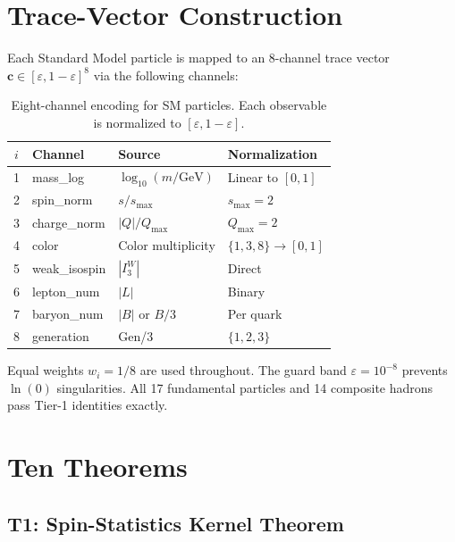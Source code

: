 \documentclass[
  aps,
  prd,
  twocolumn,
  superscriptaddress,
  nofootinbib,
  floatfix
]{revtex4-2}
\newcommand{\eps}{\varepsilon}
\newcommand{\tvec}{\mathbf{c}}
\begin{document}
\section{Trace-Vector Construction}\label{sec:trace}

Each Standard Model particle is mapped to an 8-channel trace
vector $\tvec \in [\eps, 1{-}\eps]^8$ via the following channels:

\begin{table}[h]
\caption{\label{tab:channels}Eight-channel encoding for SM particles.
Each observable is normalized to $[\eps, 1{-}\eps]$.}
\begin{ruledtabular}
\begin{tabular}{clll}
$i$ & Channel & Source & Normalization \\
\hline
1 & mass\_log & $\log_{10}(m/\text{GeV})$ & Linear to $[0,1]$ \\
2 & spin\_norm & $s/s_{\max}$ & $s_{\max} = 2$ \\
3 & charge\_norm & $|Q|/Q_{\max}$ & $Q_{\max} = 2$ \\
4 & color & Color multiplicity & $\{1, 3, 8\} \to [0,1]$ \\
5 & weak\_isospin & $|I_3^W|$ & Direct \\
6 & lepton\_num & $|L|$ & Binary \\
7 & baryon\_num & $|B|$ or $B/3$ & Per quark \\
8 & generation & Gen/$3$ & $\{1,2,3\}$ \\
\end{tabular}
\end{ruledtabular}
\end{table}

Equal weights $w_i = 1/8$ are used throughout.  The guard band
$\eps = 10^{-8}$ prevents $\ln(0)$ singularities.  All 17
fundamental particles and 14 composite hadrons pass Tier-1
identities exactly.

\section{Ten Theorems}\label{sec:theorems}

\subsection{T1: Spin-Statistics Kernel Theorem}
\end{document}
